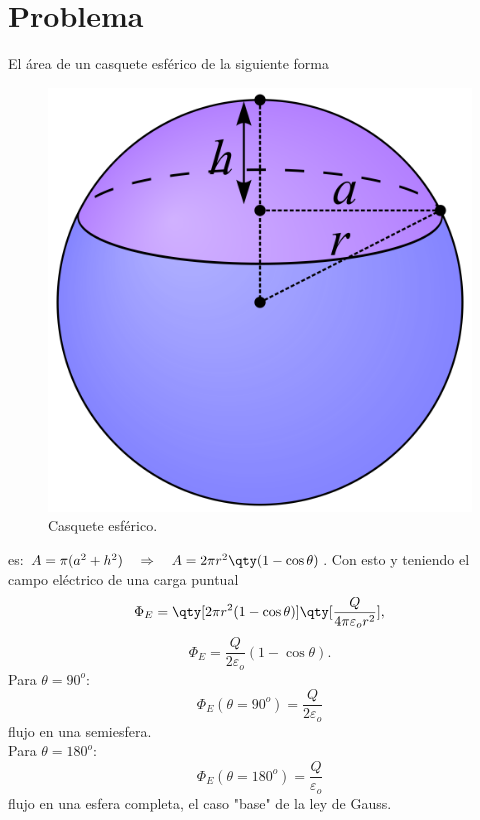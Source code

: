 \section*{Problema}

El área de un casquete esférico de la siguiente forma
	\begin{figure}[H]
		\centering
		\includegraphics[scale=0.1]{./img/casquete.png}
		\caption{Casquete esférico.}
		\label{casq}
	\end{figure}
es: $ A = \pi (a^2 + h^2) \quad \Rightarrow \quad A = 2\pi r^2 \qty(1-\cos{\theta}) $. Con esto y teniendo el campo eléctrico de una carga puntual
	$$ \Phi _E = \qty[2\pi r^2 (1-\cos{\theta})]\qty[\frac{Q}{4\pi \varepsilon _o r^2}], $$
	$$ \Phi _E = \frac{Q}{2\varepsilon _o} (1 - \cos{\theta}). $$
Para $\theta = 90^o$:
	$$ \Phi _E (\theta = 90^o) = \frac{Q}{2\varepsilon _o} $$
flujo en una semiesfera. \\
Para $\theta = 180^o$:
	$$ \Phi _E (\theta = 180^o) = \frac{Q}{\varepsilon _o} $$
flujo en una esfera completa, el caso "base" de la ley de Gauss.










